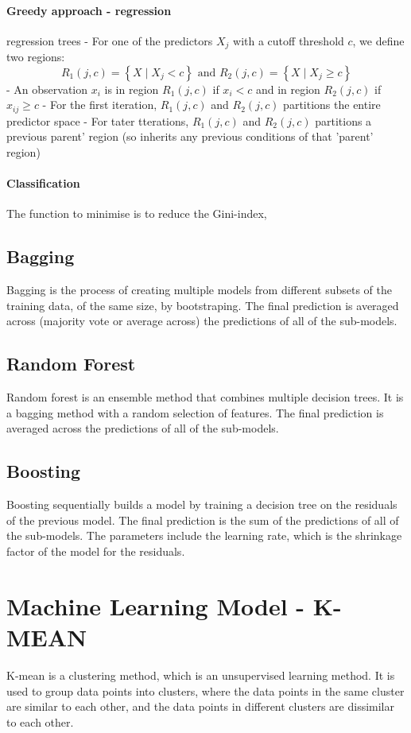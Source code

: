 \documentclass[12pt,a4paper]{article}
\begin{document}
    \paragraph*{Greedy approach - regression}
        regression trees
        - For one of the predictors $X_j$ with a cutoff threshold $c$, we define two regions:
    $$
    R_1(j, c)=\left\{X \mid X_j<c\right\} \text { and } R_2(j, c)=\left\{X \mid X_j \geq c\right\}
    $$
    - An observation $x_i$ is in region $R_1(j, c)$ if $x_i<c$ and in region $R_2(j, c)$ if $x_{i j} \geq c$
    - For the first iteration, $R_1(j, c)$ and $R_2(j, c)$ partitions the entire predictor space
    - For tater tterations, $R_1(j, c)$ and $R_2(j, c)$ partitions a previous parent' region (so inherits any previous conditions of that 'parent' region)
    \paragraph{Classification}
    The function to minimise is to reduce the Gini-index,
\subsection{Bagging}
Bagging is the process of creating multiple models from different subsets of the training data, of the same size, by bootstraping. The final prediction is averaged across (majority vote or average across) the predictions of all of the sub-models.
\subsection{Random Forest}
Random forest is an ensemble method that combines multiple decision trees. It is a bagging method with a random selection of features. The final prediction is averaged across the predictions of all of the sub-models.
\subsection{Boosting}
Boosting sequentially builds a model by training a decision tree on the residuals of the previous model. The final prediction is the sum of the predictions of all of the sub-models. The parameters include the learning rate, which is the shrinkage factor of the model for the residuals.

\section{Machine Learning Model - K-MEAN}
K-mean is a clustering method, which is an unsupervised learning method. It is used to group data points into clusters, where the data points in the same cluster are similar to each other, and the data points in different clusters are dissimilar to each other.
\end{document}
